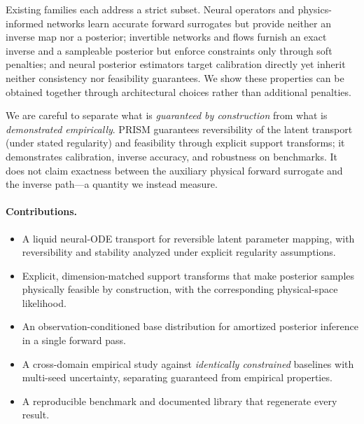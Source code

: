 \documentclass{article}
\begin{document}
Existing families each address a strict subset. Neural operators and physics-informed
networks learn accurate forward surrogates but provide neither an inverse map nor a
posterior; invertible networks and flows furnish an exact inverse and a sampleable
posterior but enforce constraints only through soft penalties; and neural posterior
estimators target calibration directly yet inherit neither consistency nor
feasibility guarantees. We show these properties can be obtained together through
architectural choices rather than additional penalties.

We are careful to separate what is \emph{guaranteed by construction} from what is
\emph{demonstrated empirically}. PRISM guarantees reversibility of the latent
transport (under stated regularity) and feasibility through explicit support
transforms; it demonstrates calibration, inverse accuracy, and robustness on
benchmarks. It does not claim exactness between the auxiliary physical
forward surrogate and the inverse path---a quantity we instead measure.

\paragraph{Contributions.}
\begin{itemize}
\item A liquid neural-ODE transport for reversible latent parameter mapping, with
reversibility and stability analyzed under explicit regularity assumptions.
\item Explicit, dimension-matched support transforms that make posterior samples
physically feasible by construction, with the corresponding physical-space
likelihood.
\item An observation-conditioned base distribution for amortized posterior
inference in a single forward pass.
\item A cross-domain empirical study against \emph{identically constrained}
baselines with multi-seed uncertainty, separating guaranteed from empirical
properties.
\item A reproducible benchmark and documented library that regenerate every result.
\end{itemize}

\end{document}
